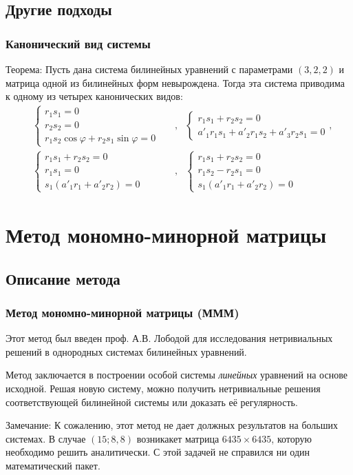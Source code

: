 \documentclass[russian,hyperref={unicode}]{beamer}
\begin{document}
\subsection{Другие подходы}
\frame
{
	\frametitle{Канонический вид системы}
	\begin{block}{Теорема:}
	Пусть дана система билинейных уравнений с параметрами $(3, 2, 2)$ и матрица одной из билинейных форм невырождена. Тогда эта система приводима к одному из четырех канонических видов: 
	\begin{align*}
		&
		\begin{cases}
		 	r_1 s_1 = 0 \\
		 	r_2 s_2 = 0 \\
		 	r_1 s_2 \cos \varphi + r_2 s_1 \sin \varphi = 0 &
		\end{cases} &, &
		\begin{cases}
			r_1 s_1 + r_2 s_2 = 0 \\
			a'_{1}r_1 s_1 + a'_2 r_1 s_2 + a'_3 r_2 s_1 = 0
		\end{cases},
		\\
		&
		\begin{cases}
			r_1 s_1 + r_2 s_2 = 0 \\
			r_1 s_1 = 0 \\
			s_1 (a'_{1} r_1 + a'_{2} r_2) = 0
		\end{cases} &, &
		\begin{cases}
			r_1 s_1 + r_2 s_2 = 0 \\ 
			r_1 s_2 - r_2 s_1 = 0 \\ 
			s_1 (a'_{1} r_1 + a'_{2} r_2) = 0
		\end{cases}
	\end{align*}
	\end{block}
}
\section{Метод мономно-минорной матрицы}
\subsection{Описание метода}
\frame
{
	\frametitle{Метод мономно-минорной матрицы (МММ)}
	Этот метод был введен проф. А.В. Лободой для исследования 
	нетривиальных решений в однородных системах билинейных уравнений.

	Метод заключается в построении особой системы \textit{линейных} 
	уравнений на основе исходной. Решая новую систему, можно получить нетривиальные решения  соответствующей билинейной системы или доказать её регулярность.

	\begin{alertblock}{Замечание:}
		К сожалению, этот метод не дает должных результатов на больших системах. В случае $(15; 8, 8)$ возникакет матрица $6435 \times 6435$, которую необходимо решить аналитически. С этой задачей не справился ни один математический пакет.
	\end{alertblock}
}
\end{document}
